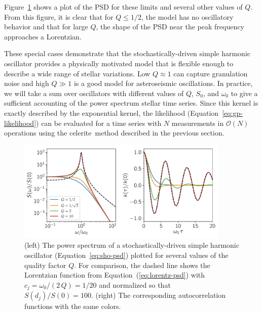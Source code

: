 \documentclass[manuscript, letterpaper]{aastex6}
\makeatletter
\let\origsection\section
\renewcommand\section{\@ifstar{\starsection}{\nostarsection}}
\newcommand\nostarsection[1]{\sectionprelude\origsection{#1}}
\newcommand\starsection[1]{\sectionprelude\origsection*{#1}}
\newcommand\sectionprelude{\vspace{1em}}
\newcommand{\project}[1]{\textsf{#1}}
\newcommand{\celerite}{\project{celerite}}
\newcommand{\figureref}[1]{\ref{fig:#1}}
\newcommand{\Figure}[1]{Figure~\figureref{#1}}
\newcommand{\figurelabel}[1]{\label{fig:#1}}
\renewcommand{\eqref}[1]{\ref{eq:#1}}
\newcommand{\Eq}[1]{Equation~(\eqref{#1})}
\newcommand{\eq}[1]{\Eq{#1}}
\newcommand{\eqalt}[1]{Equation~\eqref{#1}}
\makeatother
\begin{document}
\Figure{sho} shows a plot of the PSD for these limits and several other values
of $Q$.
From this figure, it is clear that for $Q \le 1/2$, the model has no
oscillatory behavior and that for large $Q$, the shape of the PSD near the
peak frequency approaches a Lorentzian.

These special cases demonstrate that the stochastically-driven simple harmonic
oscillator provides a physically motivated model that is flexible enough to
describe a wide range of stellar variations.
Low $Q \approx 1$ can capture granulation noise and high $Q \gg 1$ is a good
model for asteroseismic oscillations.
In practice, we will take a sum over oscillators with different values of $Q$,
$S_0$, and $\omega_0$ to give a sufficient accounting of the power spectrum
stellar time series.
Since this kernel is exactly described by the exponential kernel, the
likelihood (\eqalt{gp-likelihood}) can be evaluated for a time series with $N$
measurements in $\mathcal{O}(N)$ operations using the \celerite\ method
described in the previous section.

\begin{figure}[!htbp]
\begin{center}
\includegraphics[width=0.9\textwidth]{figures/sho.pdf}
\caption{(left) The power spectrum of a stochastically-driven simple harmonic
    oscillator (\eqalt{sho-psd}) plotted for several values of the quality
    factor $Q$.
    For comparison, the dashed line shows the Lorentzian function from
    \eq{lorentz-psd} with $c_j = \omega_0/(2\,Q) = 1/20$ and normalized so that
    $S(d_j)/S(0) = 100$.
    (right) The corresponding autocorrelation functions with the same colors.
    \figurelabel{sho}}
\end{center}
\end{figure}


\section{Examples with simulated data}
\end{document}

